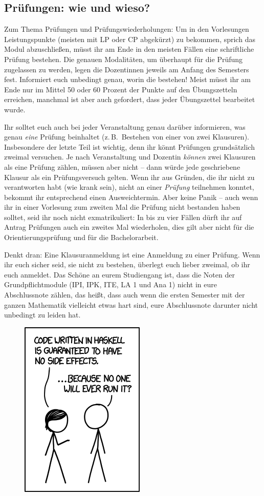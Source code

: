 \subsection{Prüfungen: wie und wieso?}

Zum Thema Prüfungen und Prüfungswiederholungen: Um in den Vorlesungen Leistungspunkte (meisten mit \gls{LP} oder \gls{CP} abgekürzt) zu bekommen, sprich das Modul abzuschließen, müsst ihr am Ende in den meisten Fällen eine schriftliche Prüfung bestehen. Die genauen Modalitäten, um überhaupt für die Prüfung zugelassen zu werden, legen die Dozentinnen jeweils am Anfang des Semesters fest. Informiert euch unbedingt genau, worin die bestehen! Meist müsst ihr am Ende nur im Mittel 50 oder 60 Prozent der Punkte auf den Übungszetteln erreichen, manchmal ist aber auch gefordert, dass jeder Übungszettel bearbeitet wurde.

Ihr solltet euch auch bei jeder Veranstaltung genau darüber informieren, was genau \emph{eine} Prüfung beinhaltet (z.\,B.\ Bestehen von einer von zwei Klausuren). Insbesondere der letzte Teil ist wichtig, denn ihr könnt Prüfungen grundsätzlich zweimal versuchen. Je nach Veranstaltung und Dozentin \emph{können} zwei Klausuren als eine Prüfung zählen, müssen aber nicht -- dann würde jede geschriebene Klausur als ein Prüfungsversuch gelten. Wenn ihr aus Gründen, die ihr nicht zu verantworten habt (wie krank sein), nicht an einer \emph{Prüfung} teilnehmen konntet, bekommt ihr entsprechend einen Ausweichtermin. Aber keine Panik -- auch wenn ihr in einer Vorlesung zum zweiten Mal die Prüfung nicht bestanden haben solltet, seid ihr noch nicht exmatrikuliert: In bis zu vier Fällen dürft ihr auf Antrag Prüfungen auch ein zweites Mal wiederholen, dies gilt aber nicht für die Orientierungsprüfung und für die Bachelorarbeit.

Denkt dran: Eine Klausuranmeldung ist eine Anmeldung zu einer Prüfung. Wenn ihr euch sicher seid, sie nicht zu bestehen, überlegt euch lieber zweimal, ob ihr euch anmeldet. Das Schöne an eurem Studiengang ist, dass die Noten der Grundpflichtmodule (IPI, IPK, ITE, LA 1 und Ana 1) nicht in eure Abschlussnote zählen, das heißt, dass auch wenn die ersten Semester mit der ganzen Mathematik vielleicht etwas hart sind, eure Abschlussnote darunter nicht unbedingt zu leiden hat.

\begin{figure}
\centering
\includegraphics[width=.5\linewidth]{bilder/haskell.png}
\end{figure}

\vspace{-\parskip}
